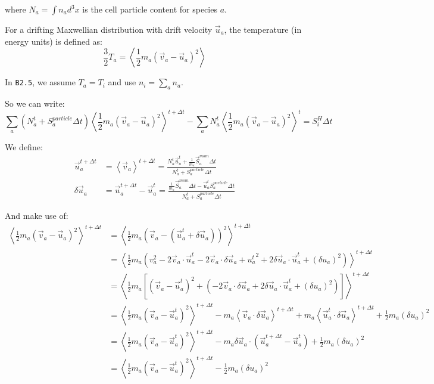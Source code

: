\documentclass[a4paper,10pt]{report}
\begin{document}
where $N_a = \int n_a d^3x$ is the cell particle content for species $a$.

For a drifting Maxwellian distribution with drift velocity
$\vec{u}_a$, the temperature (in energy units) is defined as:
\begin{equation*}
\frac{3}{2} T_a = \left \langle \frac{1}{2} m_a {\left( \vec{v}_a - \vec{u}_a \right)}^2 \right \rangle
\end{equation*}

In {\tt B2.5}, we assume $T_a = T_i$ and use $n_i = \sum_a n_a$.

So we can write:
\begin{equation}\label{eq:heatsources}
\sum_a \left( N_a^t + S_a^{particle} \Delta t \right)
{\left \langle \frac{1}{2} m_a {\left( \vec{v}_a - \vec{u}_a \right)}^2 \right \rangle}^{t+\Delta t}
- \sum_a N_a^t {\left \langle \frac{1}{2} m_a {\left( \vec{v}_a - \vec{u}_a \right)}^2 \right \rangle}^t = S_i^H \Delta t
\end{equation}

We define:
\begin{align}
\vec{u}_a^{t+\Delta t} &= {\left \langle \vec{v}_a \right \rangle}^{t+\Delta t} = \frac{N_a^t\vec{u}_a^t + \frac{1}{m_a} \vec{S}_a^{mom} \Delta t}{N_a^t + S_a^{particle} \Delta t} \\
\delta\vec{u}_a &= \vec{u}_a^{t+ \Delta t} - \vec{u}_a^t = \frac{\frac{1}{m_a} \vec{S}_a^{mom} \Delta t - \vec{u}_a^t S_a^{particle} \Delta t}{N_a^t + S_a^{particle} \Delta t}
\end{align}

And make use of:
\begin{align*}
{\left \langle \frac{1}{2} m_a {\left( \vec{v}_a - \vec{u}_a \right)}^2 \right \rangle}^{t+\Delta t} &=
{\left \langle \frac{1}{2} m_a {\left( \vec{v}_a - \left( \vec{u}_a^t + \delta\vec{u}_a \right) \right)}^2 \right \rangle}^{t+\Delta t} \\
 &= {\left \langle \frac{1}{2} m_a \left( v_a^2 - 2 \vec{v}_a\cdot\vec{u}_a^t - 2 \vec{v}_a\cdot\delta\vec{u}_a + {u_a^t}^2 + 2 \delta\vec{u}_a\cdot\vec{u}_a^t + {(\delta u_a)}^2 \right) \right \rangle}^{t+\Delta t} \\
 &= {\left \langle \frac{1}{2} m_a \left[ {\left( \vec{v}_a - \vec{u}_a^t \right)}^2 + \left( - 2 \vec{v}_a\cdot\delta\vec{u}_a + 2 \delta\vec{u}_a\cdot\vec{u}_a^t + {(\delta u_a)}^2 \right) \right] \right \rangle}^{t+\Delta t} \\
 &= {\left \langle \frac{1}{2} m_a {\left( \vec{v}_a - \vec{u}_a^t \right)}^2 \right \rangle}^{t+\Delta t}
  - m_a {\left \langle \vec{v}_a\cdot\delta\vec{u}_a \right \rangle}^{t+\Delta t}
  + m_a {\left \langle \vec{u}_a^t\cdot\delta\vec{u}_a \right \rangle}^{t+\Delta t}
  + \frac{1}{2} m_a {(\delta u_a)}^2 \\
 &= {\left \langle \frac{1}{2} m_a {\left( \vec{v}_a - \vec{u}_a^t \right)}^2 \right \rangle}^{t+\Delta t}
  - m_a \delta\vec{u}_a \cdot \left( \vec{u}_a^{t+\Delta t} - \vec{u}_a^t \right) + \frac{1}{2} m_a {(\delta u_a)}^2 \\
 &= {\left \langle \frac{1}{2} m_a {\left( \vec{v}_a - \vec{u}_a^t \right)}^2 \right \rangle}^{t+\Delta t}
  - \frac{1}{2} m_a {(\delta u_a)}^2
\end{align*}
\end{document}
